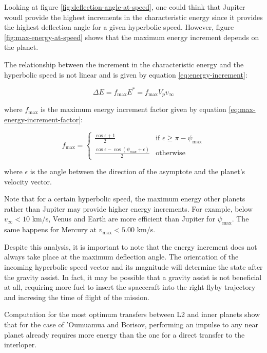 Looking at figure \ref{fig:deflection-angle-at-speed}, one could think that
Jupiter woudl provide the highest increments in the characteristic energy since
it provides the highest deflection angle for a given hyperbolic speed. However,
figure \ref{fig:max-energy-at-speed} shows that the maximum energy increment
depends on the planet.

The relationship between the increment in the characteristic energy and the
hyperbolic speed is not linear and is given by equation
\ref{eq:energy-increment}:

\begin{equation}
  \Delta E = f_{\text{max}} E^{\ast} = f_{\text{max}} V_p v_{\infty}
  \label{eq:energy-increment}
\end{equation}

where $f_{\text{max}}$ is the maximum energy increment factor given by equation
\ref{eq:max-energy-increment-factor}:

\begin{equation}
  f_{\text{max}} = \begin{cases}
    \frac{\cos{\epsilon} + 1}{2}                                         & \text{if } \epsilon \geq \pi - \psi_{\max} \\
    \frac{\cos{\epsilon} - \cos{\left(\psi_{\max} + \epsilon\right)}}{2} & \text{otherwise}
  \end{cases}
  \label{eq:max-energy-increment-factor}
\end{equation}

where $\epsilon$ is the angle between the direction of the asymptote and the
planet's velocity vector.

Note that for a certain hyperbolic speed, the maximum energy other planets
rather than Jupiter may provide higher energy increments. For example, below
$v_{\infty} < 10$ km/s, Venus and Earth are more efficient than Jupiter for
$\psi_{\text{max}}$. The same happens for Mercury at $v_{\text{max}} < 5.00$
km/s.

Despite this analysis, it is important to note that the energy increment does
not always take place at the maximum deflection angle. The orientation of the
incoming hyperbolic speed vector and its magnitude will determine the state
after the gravity assist. In fact, it may be possible that a gravity assist is
not beneficial at all, requiring more fuel to insert the spacecraft into the
right flyby trajectory and incresing the time of flight of the mission.

Computation for the most optimum transfers between L2 and inner planets show
that for the case of 'Oumuamua and Borisov, performing an impulse to any near
planet already requires more energy than the one for a direct transfer to the
interloper.
